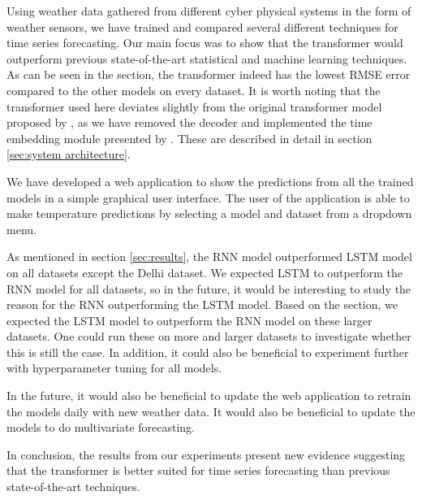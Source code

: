 Using weather data gathered from different cyber physical systems in the form of weather sensors, we have trained and compared several different techniques for time series forecasting.
Our main focus was to show that the transformer would outperform previous state-of-the-art statistical and machine learning techniques.
As can be seen in the  section, the transformer indeed has the lowest RMSE error compared to the other models on every dataset. 
It is worth noting that the transformer used here deviates slightly from the original transformer model proposed by \citet{AttentionIsAllYouNeed}, as we have removed the decoder and implemented the time embedding module presented by \citet{time2vec}.
These are described in detail in section \ref{sec:system architecture}.

We have developed a web application to show the predictions from all the trained models in a simple graphical user interface. 
The user of the application is able to make temperature predictions by selecting a model and dataset from a dropdown menu. 

As mentioned in section \ref{sec:results}, the RNN model outperformed LSTM model on all datasets except the Delhi dataset.
We expected LSTM to outperform the RNN model for all datasets, so in the future, it would be interesting to study the reason for the RNN outperforming the LSTM model.
Based on the  section, we expected the LSTM model to outperform the RNN model on these larger datasets.
One could run these on more and larger datasets to investigate whether this is still the case. 
In addition, it could also be beneficial to experiment further with hyperparameter tuning for all models.

In the future, it would also be beneficial to update the web application to retrain the models daily with new weather data. 
It would also be beneficial to update the models to do multivariate forecasting.

In conclusion, the results from our experiments present new evidence suggesting that the transformer is better suited for time series forecasting than previous state-of-the-art techniques.